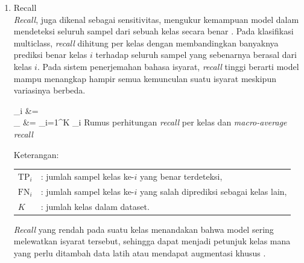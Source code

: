 \begin{enumerate}
	\item Recall \\
	\textit{Recall}, juga dikenal sebagai sensitivitas, mengukur kemampuan model dalam mendeteksi seluruh sampel dari sebuah kelas secara benar \cite{Raschka2020}. Pada klasifikasi multiclass, \textit{recall} dihitung per kelas dengan membandingkan banyaknya prediksi benar kelas $i$ terhadap seluruh sampel yang sebenarnya berasal dari kelas $i$. Pada sistem penerjemahan bahasa isyarat, \textit{recall} tinggi berarti model mampu menangkap hampir semua kemunculan suatu isyarat meskipun variasinya berbeda.\par
	\vspace{0.5cm}
	\begin{equationcaptioned}[eq:2.recall]{
		_i &=  \\
		_{} &= \sum_{i=1}^{K} _i
	}{
		Rumus perhitungan \textit{recall} per kelas dan \textit{macro-average recall}
	}\end{equationcaptioned}
	\vspace{0.5cm}

	\noindent Keterangan:

	\begin{tabular}{@{}ll}
	$\mathrm{TP}_i$ & : jumlah sampel kelas ke-$i$ yang benar terdeteksi, \\
	$\mathrm{FN}_i$ & : jumlah sampel kelas ke-$i$ yang salah diprediksi sebagai kelas lain, \\
	$K$ & : jumlah kelas dalam dataset. \\
	\end{tabular}

	\vspace{0.5cm}
	\textit{Recall} yang rendah pada suatu kelas menandakan bahwa model sering melewatkan isyarat tersebut, sehingga dapat menjadi petunjuk kelas mana yang perlu ditambah data latih atau mendapat augmentasi khusus \cite{Raschka2020}.\par


\end{enumerate}
